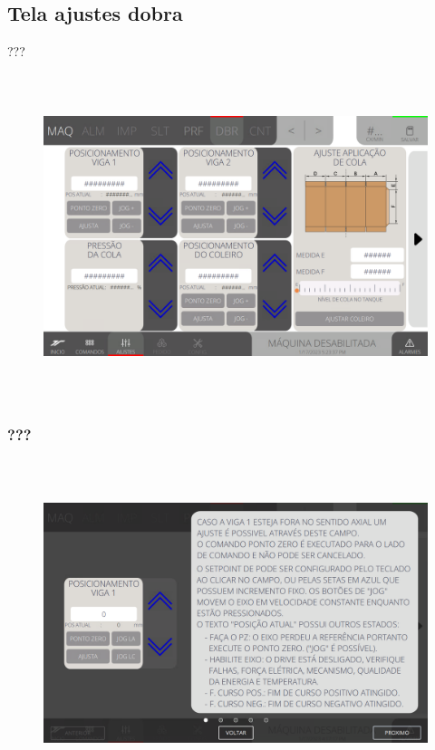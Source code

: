 \thispagestyle{fancy}
\vspace*{\fill}
\subsection{Tela ajustes dobra}
 ???
\begin{figure}[h]
  \centering
  \includegraphics[width=576px,height=360px]{src/imagesFlexo/07-fold/settings/e-Tela-Principal.png}
   \label{}
\end{figure}

\newpage
\thispagestyle{fancy}
\vspace*{\fill}
\subsubsection{\small{???}}
\begin{figure}[h]
  \centering
  \includegraphics[width=576px,height=360px]{src/imagesFlexo/07-fold/settings/e-1.png}
   \label{}
\end{figure}
\vspace*{\fill}

